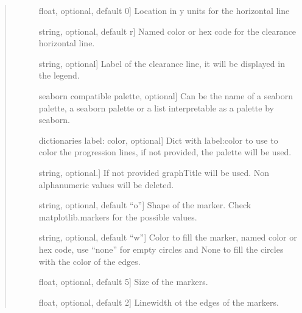 \documentclass[letterpaper,10pt,english]{sphinxmanual}
\begin{document}
\begin{fulllineitems}
\begin{quote}
\begin{description}
\begin{description}
\item[{}] \leavevmode{[}float, optional, default 0{]}
Location in y units for the horizontal line

\item[{}] \leavevmode{[}string, optional, default r{]}
Named color or hex code for the clearance horizontal line.

\item[{}] \leavevmode{[}string, optional{]}
Label of the clearance line, it will 
be displayed in the legend.

\item[{}] \leavevmode{[}seaborn compatible palette, optional{]}
Can be the name of a seaborn palette, 
a seaborn palette or a list interpretable 
as a palette by seaborn.

\item[{}] \leavevmode{[}dictionaries label: color, optional{]}
Dict with label:color to use to color the progression lines,
if not provided, the palette will be used.

\item[{}] \leavevmode{[}string, optional.{]}
If not provided graphTitle will be used. 
Non alphanumeric values will be deleted.

\item[{}] \leavevmode{[}string, optional, default “o”{]}
Shape of the marker. Check matplotlib.markers for the possible values.

\item[{}] \leavevmode{[}string, optional, default “w”{]}
Color to fill the marker, named color or hex code, 
use “none” for empty circles and
None to fill the circles with the color of the edges.

\item[{}] \leavevmode{[}float, optional, default 5{]}
Size of the markers.

\item[{}] \leavevmode{[}float, optional,  default 2{]}
Linewidth ot the edges of the markers.

\end{description}

\end{description}\end{quote}

\end{fulllineitems}
\end{document}
